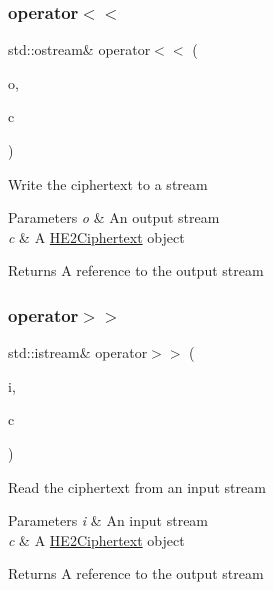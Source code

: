 \subsubsection{\texorpdfstring{operator$<$$<$}{operator<<}}
{\footnotesize\ttfamily std\+::ostream\& operator$<$$<$ (\begin{DoxyParamCaption}\item[{std\+::ostream \&}]{o,  }\item[{const \hyperlink{classHE2Ciphertext}{H\+E2\+Ciphertext} \&}]{c }\end{DoxyParamCaption})\hspace{0.3cm}{\ttfamily [friend]}}

Write the {\ttfamily ciphertext} to a stream 
\begin{DoxyParams}{Parameters}
{\em o} & An output stream \\
\hline
{\em c} & A {\ttfamily \hyperlink{classHE2Ciphertext}{H\+E2\+Ciphertext}} object \\
\hline
\end{DoxyParams}
\begin{DoxyReturn}{Returns}
A reference to the output stream 
\end{DoxyReturn}
\mbox{\label{classHE2Ciphertext_a8cd6e8f36f12e9b0548d6f66fae71816}} 
\subsubsection{\texorpdfstring{operator$>$$>$}{operator>>}}
{\footnotesize\ttfamily std\+::istream\& operator$>$$>$ (\begin{DoxyParamCaption}\item[{std\+::istream \&}]{i,  }\item[{\hyperlink{classHE2Ciphertext}{H\+E2\+Ciphertext} \&}]{c }\end{DoxyParamCaption})\hspace{0.3cm}{\ttfamily [friend]}}

Read the {\ttfamily ciphertext} from an input stream 
\begin{DoxyParams}{Parameters}
{\em i} & An input stream \\
\hline
{\em c} & A {\ttfamily \hyperlink{classHE2Ciphertext}{H\+E2\+Ciphertext}} object \\
\hline
\end{DoxyParams}
\begin{DoxyReturn}{Returns}
A reference to the output stream 
\end{DoxyReturn}


